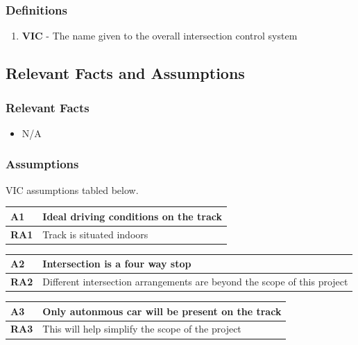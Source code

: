 \documentclass [11pt]{article}
\begin{document}
\subsubsection{Definitions}
\begin{enumerate}
	\itemsep0pt
	\item \textbf{VIC} - The name given to the overall intersection control system
\end{enumerate}

	
\subsection{Relevant Facts and Assumptions} 

\subsubsection{Relevant Facts}
\begin{itemize}
	\item N/A
\end{itemize}

\subsubsection{Assumptions}
VIC assumptions tabled below. 
\begin{longtable}{| p{ } | p{ } | }\hline 
\textbf{A1} & \textbf{Ideal driving conditions on the track} \\ \hline
\textbf{RA1} & Track is situated indoors \\ \hline 
\end{longtable}

\begin{longtable}{| p{ } | p{ } | }\hline 
\textbf{A2} & \textbf{Intersection is a four way stop} \\ \hline
\textbf{RA2} &  Different intersection arrangements are beyond the scope of this project \\ \hline
\end{longtable}

\begin{longtable}{| p{ } | p{ } | }\hline 
\textbf{A3} & \textbf{Only autonmous car will be present on the track} \\ \hline
\textbf{RA3} &  This will help simplify the scope of the project\\ \hline
\end{longtable}
\end{document}
